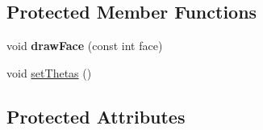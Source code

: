 \subsection*{Protected Member Functions}
\begin{DoxyCompactItemize}
\item 
\hypertarget{classRigging_af6da354400ffa25565c49bed18a1afc2}{
void {\bfseries drawFace} (const int face)}
\label{classRigging_af6da354400ffa25565c49bed18a1afc2}

\item 
void \hyperlink{classRigging_aff45671b55d4d94d140935b8998236b7}{setThetas} ()
\end{DoxyCompactItemize}
\subsection*{Protected Attributes}
